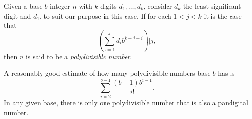 \documentclass[12pt]{article}
\begin{document}
Given a base $b$ integer $n$ with $k$ digits $d_1, \ldots, d_k$, consider $d_k$ the least significant digit and $d_1$, to suit our purpose in this case. If for each $1 < j < k$ it is the case that $$(\sum_{i = 1}^j d_ib^{k - j - i}) | j,$$ then $n$ is said to be a {\em polydivisible number}.

A reasonably good estimate of how many polydivisible numbers base $b$ has is $$\sum_{i = 2}^{b - 1} \frac{(b - 1)b^{i - 1}}{i!}.$$ In any given base, there is only one polydivisible number that is also a pandigital number.
\end{document}
